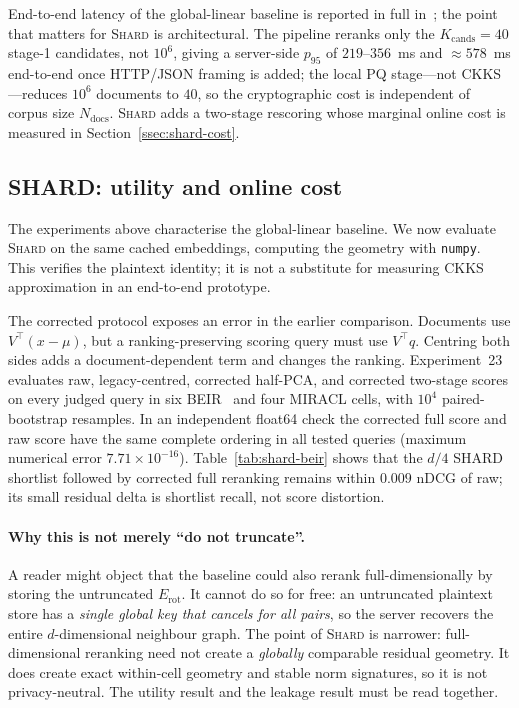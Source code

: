 \documentclass[11pt,a4paper]{article}
\begin{document}
End-to-end latency of the global-linear baseline is reported in full
in~\cite{ref_alpha}; the point that matters for \textsc{Shard} is
architectural. The pipeline reranks only the $K_{\mathrm{cands}}{=}40$
stage-1 candidates, not $10^6$, giving a server-side $p_{95}$ of
$219$--$356$~ms and $\approx578$~ms end-to-end once HTTP/JSON framing is
added; the local PQ stage---not CKKS---reduces $10^6$ documents to $40$, so
the cryptographic cost is independent of corpus size $N_{\mathrm{docs}}$.
\textsc{Shard} adds a two-stage rescoring whose marginal online cost is
measured in Section~\ref{ssec:shard-cost}.

\subsection{SHARD: utility and online cost}\label{ssec:shard-utility}

The experiments above characterise the global-linear baseline. We now
evaluate \textsc{Shard} on the same cached embeddings, computing the
geometry with \texttt{numpy}. This verifies the plaintext identity; it is not
a substitute for measuring CKKS approximation in an end-to-end prototype.

The corrected protocol exposes an error in the earlier comparison. Documents
use $V^\top(x-\mu)$, but a ranking-preserving scoring query must use
$V^\top q$. Centring both sides adds a document-dependent term and changes
the ranking. Experiment~23 evaluates raw, legacy-centred, corrected
half-PCA, and corrected two-stage scores on every judged query in six
BEIR~\cite{ref_beir}
and four MIRACL cells, with $10^4$ paired-bootstrap resamples. In an
independent float64 check the corrected full score and raw score have the
same complete ordering in all tested queries (maximum numerical error
$7.71\times10^{-16}$). Table~\ref{tab:shard-beir} shows that the $d/4$ SHARD
shortlist followed by corrected full reranking remains within $0.009$ nDCG
of raw; its small residual delta is shortlist recall, not score distortion.

\paragraph{Why this is not merely ``do not truncate''.} A reader might
object that the baseline could also rerank full-dimensionally by storing
the untruncated $E_{\mathrm{rot}}$. It cannot do so for free: an untruncated
plaintext store has a \emph{single global key that cancels for all pairs},
so the server recovers the entire $d$-dimensional neighbour graph. The
point of \textsc{Shard} is narrower: full-dimensional reranking need not
create a \emph{globally} comparable residual geometry. It does create exact
within-cell geometry and stable norm signatures, so it is not privacy-neutral.
The utility result and the leakage result must be read together.
\end{document}
